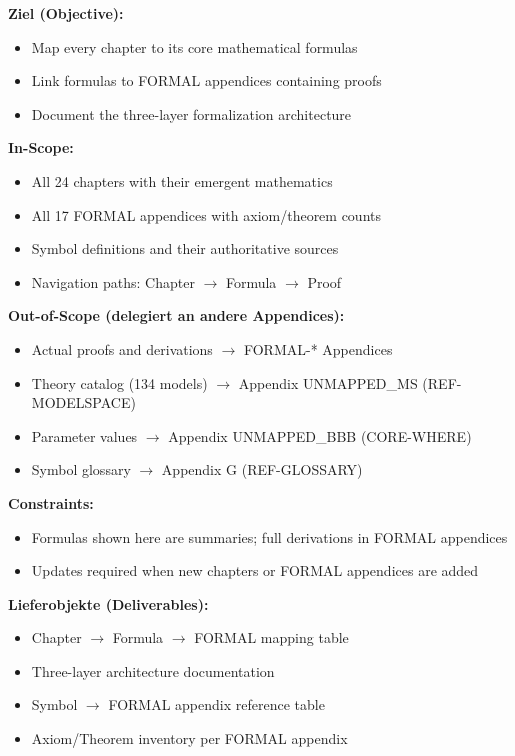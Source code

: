 \begin{tcolorbox}[
    colback=orange!5!white,
    colframe=orange!75!black,
    title={\textbf{Appendix Scope: Ziel / In-Scope / Out-of-Scope / Constraints}},
    fonttitle=\bfseries
]

\textbf{Ziel (Objective):}
\begin{itemize}[nosep]
    \item Map every chapter to its core mathematical formulas
    \item Link formulas to FORMAL appendices containing proofs
    \item Document the three-layer formalization architecture
\end{itemize}

\textbf{In-Scope:}
\begin{itemize}[nosep]
    \item All 24 chapters with their emergent mathematics
    \item All 17 FORMAL appendices with axiom/theorem counts
    \item Symbol definitions and their authoritative sources
    \item Navigation paths: Chapter $\rightarrow$ Formula $\rightarrow$ Proof
\end{itemize}

\textbf{Out-of-Scope (delegiert an andere Appendices):}
\begin{itemize}[nosep]
    \item Actual proofs and derivations $\rightarrow$ FORMAL-* Appendices
    \item Theory catalog (134 models) $\rightarrow$ Appendix UNMAPPED_MS (REF-MODELSPACE)
    \item Parameter values $\rightarrow$ Appendix UNMAPPED_BBB (CORE-WHERE)
    \item Symbol glossary $\rightarrow$ Appendix G (REF-GLOSSARY)
\end{itemize}

\textbf{Constraints:}
\begin{itemize}[nosep]
    \item Formulas shown here are summaries; full derivations in FORMAL appendices
    \item Updates required when new chapters or FORMAL appendices are added
\end{itemize}

\textbf{Lieferobjekte (Deliverables):}
\begin{itemize}[nosep]
    \item Chapter $\rightarrow$ Formula $\rightarrow$ FORMAL mapping table
    \item Three-layer architecture documentation
    \item Symbol $\rightarrow$ FORMAL appendix reference table
    \item Axiom/Theorem inventory per FORMAL appendix
\end{itemize}

\end{tcolorbox}

